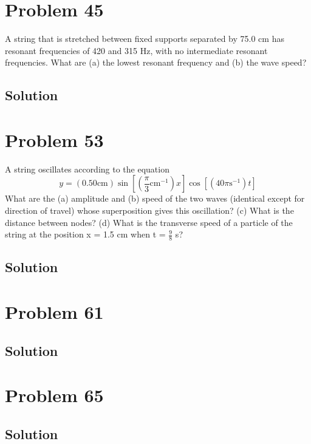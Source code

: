 \documentclass[12pt]{article}
\begin{document}
    \section{Problem 45}
        A string that is stretched between fixed supports separated by 75.0 cm has resonant frequencies of 420 and 315 Hz, with no intermediate resonant frequencies. 
        What are (a) the lowest resonant frequency and (b) the wave speed?

        \subsection{Solution}

    \section{Problem 53}
        A string oscillates according to the equation
        \begin{equation}
            y = (0.50 \unit{\centi\meter}) \sin \left[  ( \frac{\pi}{3} \unit{\centi\meter^{-1}})x \right] \cos\left[ (40\pi \unit{\second^{-1}} )t \right]
        \end{equation}
        What are the (a) amplitude and (b) speed of the two waves (identical except for direction of travel) whose superposition gives this oscillation? 
        (c) What is the distance between nodes? 
        (d) What is the transverse speed of a particle of the string at the position x = 1.5 cm when t = $\frac{9}{8}$ s?

        \subsection{Solution}

    \pagebreak
    \section{Problem 61}

        \subsection{Solution}

    \pagebreak
    \section{Problem 65}

        \subsection{Solution}
\end{document}
